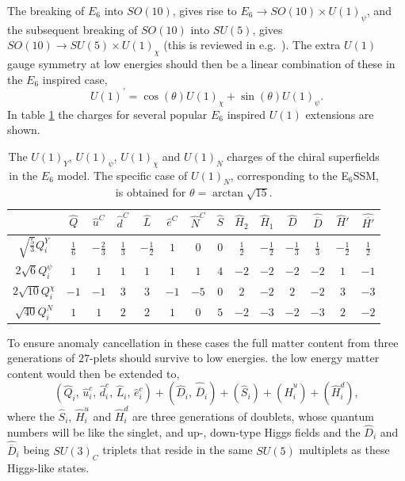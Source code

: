 \documentclass[preprint,amsmath,amssymb,aps,superscriptaddress,prd,showpacs,floatfix]{revtex4-1}
\newcommand{\be}{\begin{equation}}
\newcommand{\ee}{\end{equation}}
\begin{document}
The breaking of $E_6$ into $SO(10)$, gives rise to $E_6\to
SO(10)\times U(1)_{\psi}$, and the subsequent breaking of $SO(10)$
into $SU(5)$, gives $SO(10)\to SU(5)\times U(1)_{\chi}$ (this is
reviewed in e.g.~\cite{Langacker:2008yv}). The extra $U(1)$ gauge symmetry at low energies should then be a linear combination of these in the $E_6$ inspired case,
\be
U(1)^\prime = \cos(\theta) U(1)_{\chi} + \sin(\theta) U(1)_{\psi}.
\ee In table \ref{tab:E6charges} the charges for several popular $E_6$ inspired $U(1)$ extensions are shown.
\begin{table}[h]
\centering
\begin{ruledtabular}
\begin{tabular}{cccccccccccccc}
 & $\hat{Q}$ & $\hat{u}^C$ & $\hat{d}^C$ & $\hat{L}$ & $\hat{e}^C$ & $\hat{N}^C$ & $\hat{S}$ & $\hat{H}_2$ & $\hat{H}_1$ & $\hat{D}$ & $\hat{\overline{D}}$ & $\hat{H}'$ & $\hat{\overline{H'}}$ \\[1mm]
\hline
$\sqrt{\frac{5}{3}}Q_i^Y$ & $\frac{1}{6}$ & $-\frac{2}{3}$ & $\frac{1}{3}$ & $-\frac{1}{2}$ & $1$ & $0$ & $0$ & $\frac{1}{2}$ & $-\frac{1}{2}$ & $-\frac{1}{3}$ & $\frac{1}{3}$ & $-\frac{1}{2}$ & $\frac{1}{2}$ \\[1mm]
$2\sqrt{6}Q_i^\psi$ & $1$ & $1$ & $1$ & $1$ & $1$ & $1$ & $4$ & $-2$ & $-2$ & $-2$ & $-2$ & $1$ & $-1$\\[1mm]
$2\sqrt{10}Q_i^\chi$ & $-1$ & $-1$ & $3$ & $3$ & $-1$ & $-5$ & $0$ & $2$ & $-2$ & $2$ & $-2$ & $3$ & $-3$\\[1mm]
$\sqrt{40}Q_i^N$ & $1$ & $1$ & $2$ & $2$ & $1$ & $0$ & $5$ & $-2$ & $-3$ & $-2$ & $-3$ & $2$ & $-2$ \\[1mm]
\end{tabular}
\end{ruledtabular}
\caption{The $U(1)_Y$, $U(1)_\psi$, $U(1)_\chi$ and $U(1)_N$ charges of the chiral superfields in the $E_6$ model. The specific case of $U(1)_N$, corresponding to the E$_6$SSM, is obtained for $\theta=\arctan\sqrt{15}$.}
\label{tab:E6charges}
\end{table}

To ensure anomaly cancellation in these cases the full matter content
from three generations of $27$-plets should survive to low energies.
the low energy matter content would then be extended to, \be
(\hat{Q}_i,\,\hat{u}^c_i,\,\hat{d}^c_i,\,\hat{L}_i,\,\hat{e}^c_i)
+(\hat{D}_i,\,\hat{\overline{D}}_i)+(\hat{S}_{i})+(\hat{H}^u_i)+(\hat{H}^d_i),\ee
where the $\hat{S}_{i}$, $\hat{H}^u_i$ and $\hat{H}^d_i$ are three
generations of doublets, whose quantum numbers will be like the
singlet, and up-, down-type Higgs fields and the $\hat{D}_i$ and
$\hat{\overline{D}}_i$ being $SU(3)_C$ triplets that reside in the same $SU(5)$
multiplets as these Higgs-like states.
\end{document}
